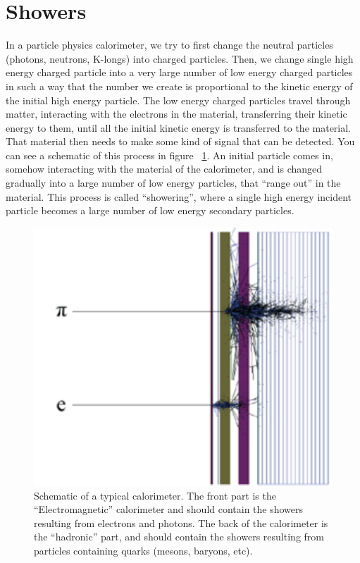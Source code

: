 \;
\;

\section{Showers}

\noindent
In a particle physics calorimeter, we try to first change the neutral particles (photons, neutrons, K-longs) into charged particles. Then, we change single high energy charged particle into a very large number of low energy charged particles in such a way that the number we create is proportional to the kinetic energy of the initial high energy particle. The low energy charged particles travel through matter, interacting with the electrons in the material, transferring their kinetic energy to them, until all the initial kinetic energy is transferred to the material. That material then needs to make some kind of signal that can be detected. You can see a schematic of this process in figure ~\ref{fig:cal1}. An initial particle comes in, somehow interacting with the material of the calorimeter, and is changed gradually into a large number of low energy particles, that ``range out'' in the material. This process is called ``showering'',
where a single high energy incident particle becomes a large
number of low energy {\color{red} secondary} particles.

\;
\;

\begin{figure}[h]
\centering\includegraphics[scale=1.0]{./calorimetry/Pictures/fig1.pdf}
\caption{Schematic of a typical calorimeter. The front part is the ``Electromagnetic'' calorimeter and should contain the showers resulting from electrons and photons. The back of the calorimeter is the ``hadronic'' part, and should contain the showers resulting from particles containing quarks (mesons, baryons, etc).}
\label{fig:cal1}
\end{figure}

